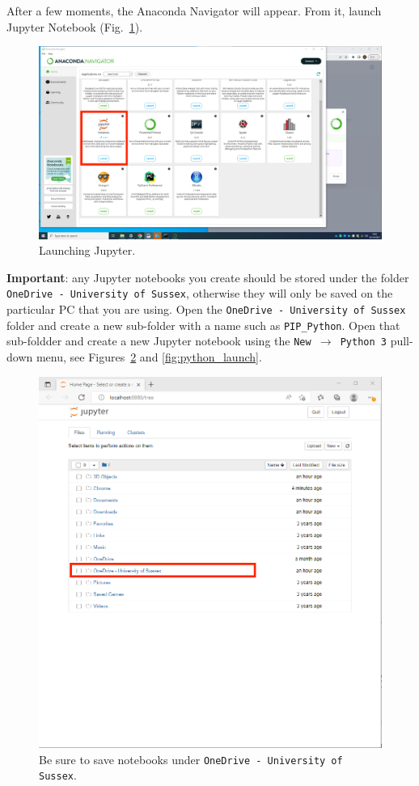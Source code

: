 After a few moments, the Anaconda Navigator will appear.  From it, launch Jupyter Notebook (Fig.~\ref{fig:jupyter_launch}).

\begin{figure}[htbp]  
\centering
\includegraphics[width=12cm]{Figures/jupyter_launch.png}
\caption{Launching Jupyter.}
\label{fig:jupyter_launch}
\end{figure}

{\bf Important}: any Jupyter notebooks you create should be stored under the folder {\tt OneDrive - University of Sussex}, otherwise they will only be saved on the particular PC that you are using.
Open the {\tt OneDrive - University of Sussex} folder and create a new sub-folder with a name such as \verb|PIP_Python|.
Open that sub-foldder and create a new Jupyter notebook using the {\tt New $\rightarrow$ Python 3} pull-down menu, see Figures~\ref{fig:onedrive} and \ref{fig:python_launch}.

\begin{figure}[htbp]  
\centering
\includegraphics[width=12cm]{Figures/onedrive.png}
\caption{Be sure to save notebooks under {\tt OneDrive - University of Sussex}.}
\label{fig:onedrive}
\end{figure}

